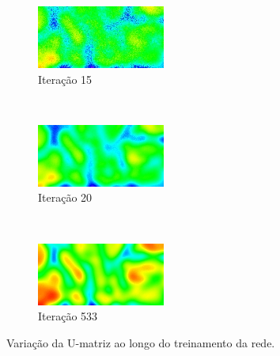 \begin{figure}[H]
  \begin{subfigure}{0.3\textwidth}
    \includegraphics[width=\textwidth]{imagens/som3_aux.jpg}
    \caption{Iteração 15}
    \label{fig:som4}
  \end{subfigure}~
  \begin{subfigure}{0.3\textwidth}
    \includegraphics[width=\textwidth]{imagens/som2_aux.jpg}
    \caption{Iteração 20}
    \label{fig:som5}
  \end{subfigure}~
  \begin{subfigure}{0.3\textwidth}
    \includegraphics[width=\textwidth]{imagens/som1_aux.jpg}
    \caption{Iteração 533}
    \label{fig:som6}
  \end{subfigure}

  \caption{Variação da U-matriz ao longo do treinamento da rede.}
  \label{fig:som_var}
\end{figure}

